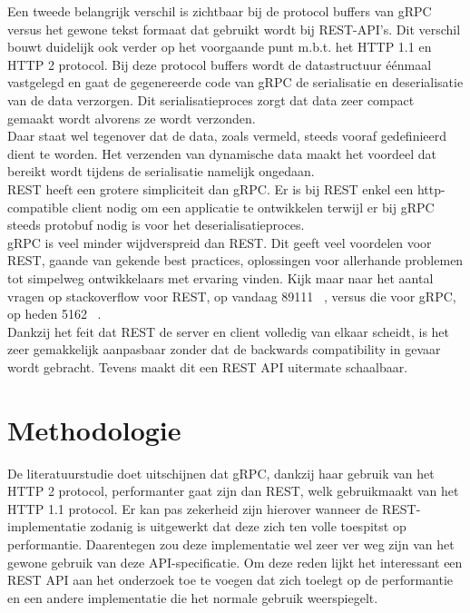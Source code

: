 Een tweede belangrijk verschil is zichtbaar bij de protocol buffers van gRPC versus het gewone tekst formaat dat gebruikt wordt bij REST-API's.
Dit verschil bouwt duidelijk ook verder op het voorgaande punt m.b.t. het HTTP 1.1 en HTTP 2 protocol.
Bij deze protocol buffers wordt de datastructuur éénmaal vastgelegd en gaat de gegenereerde code van gRPC de serialisatie en deserialisatie van de data verzorgen.
Dit serialisatieproces zorgt dat data zeer compact gemaakt wordt alvorens ze wordt verzonden. ~\autocite{googleprotobufguide}\\

Daar staat wel tegenover dat de data, zoals vermeld, steeds vooraf gedefinieerd dient te worden.
Het verzenden van dynamische data maakt het voordeel dat bereikt wordt tijdens de serialisatie namelijk ongedaan.\\

REST heeft een grotere simpliciteit dan gRPC. Er is bij REST enkel een http-compatible client nodig om een applicatie te ontwikkelen terwijl
er bij gRPC steeds protobuf nodig is voor het deserialisatieproces.\\

gRPC is veel minder wijdverspreid dan REST. Dit geeft veel voordelen voor REST, gaande van gekende best practices, oplossingen voor allerhande problemen
tot simpelweg ontwikkelaars met ervaring vinden. Kijk maar naar het aantal vragen op stackoverflow voor REST, op vandaag 89111 ~\parencite{stackrest},
versus die voor gRPC, op heden 5162 ~\parencite{stackgrpc}.\\

Dankzij het feit dat REST de server en client volledig van elkaar scheidt, is het zeer gemakkelijk aanpasbaar zonder dat de backwards compatibility in
gevaar wordt gebracht. Tevens maakt dit een REST API uitermate schaalbaar.
~\autocite{protobuf}

\section{Methodologie}%
\label{sec:methodologie}

De literatuurstudie doet uitschijnen dat gRPC, dankzij haar gebruik van het HTTP 2 protocol, performanter gaat zijn dan REST, welk gebruikmaakt van het HTTP 1.1 protocol.
Er kan pas zekerheid zijn hierover wanneer de REST-implementatie zodanig is uitgewerkt dat deze zich ten volle toespitst op performantie.
Daarentegen zou deze implementatie wel zeer ver weg zijn van het gewone gebruik van deze API-specificatie.
Om deze reden lijkt het interessant een REST API aan het onderzoek toe te voegen dat zich toelegt op de performantie en
een andere implementatie die het normale gebruik weerspiegelt.\\

